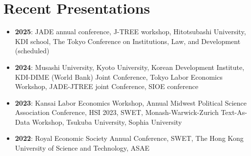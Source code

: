 \documentclass[12pt]{article}
\begin{document}
\section*{Recent Presentations}
\begin{itemize}
    \item \textbf{2025}: JADE annual conference, J-TREE workshop, Hitotsubashi University, KDI school, The Tokyo Conference on Institutions, Law, and Development (scheduled)
    \item \textbf{2024}: Musashi University, Kyoto University, Korean Development Institute, KDI-DIME (World Bank) Joint Conference, Tokyo Labor Economics Workshop, JADE-JTREE joint Conference, SIOE conference
    \item \textbf{2023}: Kansai Labor Economics Workshop, Annual Midwest Political Science Association Conference, HSI 2023, SWET, Monash-Warwick-Zurich Text-As-Data Workshop, Tsukuba University, Sophia University
    \item \textbf{2022}: Royal Economic Society Annual Conference, SWET, The Hong Kong University of Science and Technology, ASAE
\end{itemize}

\end{document}
